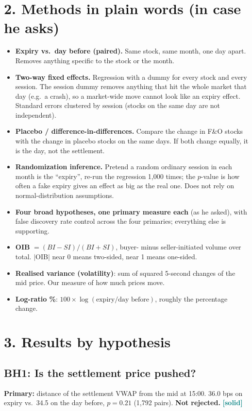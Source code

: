 \documentclass[11pt]{article}
\newcommand{\solid}{\textcolor{teal}{\textbf{[solid]}}}
\begin{document}
\section*{2. Methods in plain words (in case he asks)}
\begin{itemize}
  \item \textbf{Expiry vs.\ day before (paired).} Same stock, same month, one day apart. Removes
  anything specific to the stock or the month.
  \item \textbf{Two-way fixed effects.} Regression with a dummy for every stock and every
  session. The session dummy removes anything that hit the whole market that day (e.g.\ a crash),
  so a market-wide move cannot look like an expiry effect. Standard errors clustered by session
  (stocks on the same day are not independent).
  \item \textbf{Placebo / difference-in-differences.} Compare the change in F\&O stocks with the
  change in placebo stocks on the same days. If both change equally, it is the day, not the
  settlement.
  \item \textbf{Randomization inference.} Pretend a random ordinary session in each month is the
  ``expiry'', re-run the regression 1,000 times; the $p$-value is how often a fake expiry gives
  an effect as big as the real one. Does not rely on normal-distribution assumptions.
  \item \textbf{Four broad hypotheses, one primary measure each} (as he asked), with false
  discovery rate control across the four primaries; everything else is supporting.
  \item \textbf{OIB} $= (BI - SI)/(BI + SI)$, buyer- minus seller-initiated volume over total.
  $|$OIB$|$ near 0 means two-sided, near 1 means one-sided.
  \item \textbf{Realised variance (volatility)}: sum of squared 5-second changes of the mid
  price. Our measure of how much prices move.
  \item \textbf{Log-ratio \%}: $100 \times \log(\text{expiry}/\text{day before})$, roughly the
  percentage change.
\end{itemize}

\section*{3. Results by hypothesis}

\subsection*{BH1: Is the settlement price pushed?}
\textbf{Primary:} distance of the settlement VWAP from the mid at 15:00. 36.0 bps on expiry vs.\
34.5 on the day before, $p=0.21$ (1,792 pairs). \textbf{Not rejected.} \solid
\end{document}
